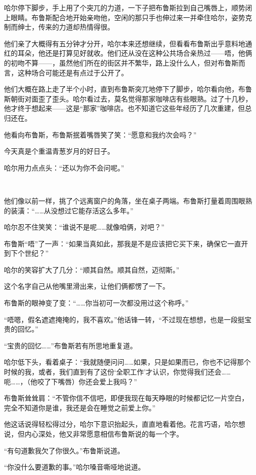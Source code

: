 \documentclass[../main]{subfiles}
\begin{document}
哈尔停下脚步，手上用了个突兀的力道，一下子把布鲁斯拉到自己嘴唇上，顺势闭上眼睛。布鲁斯配合地开始亲吻他，空闲的那只手也伸过来一并牵住哈尔，姿势克制而绅士，传来的力道却热情得很。

他们亲了大概得有五分钟才分开，哈尔本来还想继续，但看看布鲁斯出乎意料地通红的耳朵，他还是打算见好就收。他们还从没在这种公共场合亲热过——唔，他俩的初吻不算——，虽然他们所在的街区并不繁华，路上没什么人，但对布鲁斯而言，这种场合可能还是有点过于公开了。

他们大概在路上走了半个小时，直到布鲁斯突兀地停下了脚步，哈尔看向他，布鲁斯朝街对面歪了歪头。哈尔看过去，莫名觉得那家咖啡店有些眼熟。过了十几秒，他才终于想起来——这是“那家”咖啡店。也不知道它这些年经历了几次重建，但总归还在。

他看向布鲁斯，布鲁斯抿着嘴唇笑了笑：“愿意和我约次会吗？”

今天真是个重温青葱岁月的好日子。

哈尔用力点点头：“还以为你不会问呢。”

~\

他们像以前一样，挑了个远离窗户的角落，坐在桌子两端。布鲁斯打量着周围眼熟的装潢：“……从没想过它能存活这么多年。”

哈尔忍不住笑笑：“谁说不是呢……就像咱俩，对吧？”

布鲁斯“唔”了一声：“如果当真如此，那我是不是应该把它买下来，确保它一直开到下个世纪？”

哈尔的笑容扩大了几分：“顺其自然。顺其自然，迈彻斯。”

这个名字自己从他嘴里滑出来，让他们俩都愣了一下。

布鲁斯的眼神变了变：“……你当初可一次都没用过这个称呼。”

“唔嗯，假名遮遮掩掩的，我不喜欢。”他话锋一转，“不过现在想想，也是一段挺宝贵的回忆。”

“宝贵的回忆……”布鲁斯若有所思地重复道。

哈尔低下头，看着桌子：“我就随便问问……如果，只是如果而已，你也不记得那个时候的我，或者，我们直到有了这份‘全职工作’才认识，你觉得我们还会……呃……，（他咬了下嘴唇）你还会爱上我吗？”

布鲁斯耸耸肩：“不管你信不信吧，即便我现在每天睁眼的时候都记忆一片空白，完全不知道你是谁，我还是会在睡觉之前爱上你。”

他这话说得轻松得过分，哈尔下意识抬起头，直直地看着他。花言巧语，哈尔想说，但内心深处，他又非常愿意相信布鲁斯说的每一个字。

“有句道歉我欠了你很久。”布鲁斯说道。

“你没什么要道歉的事。”哈尔嗓音嘶哑地说道。
\end{document}
